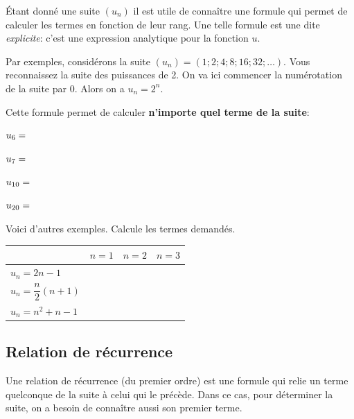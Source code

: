 \documentclass[a4paper,12pt]{report}
\begin{document}
Étant donné une suite \((u_n)\) il est utile de connaître une formule qui permet
de calculer les termes en fonction de leur rang. Une telle formule est une dite
\emph{explicite}: c'est une expression analytique pour la fonction \(u\).

Par exemples, considérons la suite \((u_n)=(1;2;4;8;16;32;\ldots)\). Vous
reconnaissez la suite des puissances de 2. On va ici commencer la numérotation
de la suite par \(0\). Alors on a \(u_n=2^n\).

Cette formule permet de calculer \textbf{n'importe quel terme de la suite}:

\par \setlength{\columnseprule}{0 pt}
          \begin{minipage}[t]{\linewidth}
          \begin{multicols}{2}
\(u_6=\dotfill\)

\(u_7=\dotfill\)

\columnbreak

\(u_{10}=\dotfill\)

\(u_{20}=\dotfill\)


\end{multicols}\end{minipage}

Voici d'autres exemples. Calcule les termes demandés.

\begin{center}
\begin{tabular}{|p{3cm}|p{3cm}|p{3cm}|p{3cm}|}
\hline
 & \(n=1\) & \(n=2\) & \(n=3\)\\[0pt]
\hline
\(u_n=2n-1\) &  &  & \\[0pt]
\hline
\(u_n=\dfrac{n}{2}(n+1)\) &  &  & \\[0pt]
\hline
\(u_n=n^2+n-1\) &  &  & \\[0pt]
\hline
\end{tabular}
\end{center}

\subsection{Relation de récurrence}
\label{sec:org8bd89ca}

\begin{definition}
Une relation de récurrence (du premier ordre) est une formule qui relie un terme
quelconque de la suite à celui qui le précède. Dans ce cas, pour déterminer la
suite, on a besoin de connaître aussi son premier terme.
\end{definition}
\end{document}
